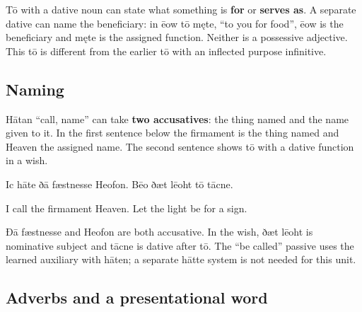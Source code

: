 Tō with a dative noun can state what something is \textbf{for} or \textbf{serves as}. A separate dative can name the beneficiary: in ēow tō męte, “to you for food”, ēow is the beneficiary and męte is the assigned function. Neither is a possessive adjective. This tō is different from the earlier tō with an inflected purpose infinitive.

\subsection*{Naming}

Hātan “call, name” can take \textbf{two accusatives}: the thing named and the name given to it. In the first sentence below the firmament is the thing named and Heaven the assigned name. The second sentence shows tō with a dative function in a wish.

Ic hāte ðā fæstnesse Heofon. Bēo ðæt lēoht tō tācne.

I call the firmament Heaven. Let the light be for a sign.

Ðā fæstnesse and Heofon are both accusative. In the wish, ðæt lēoht is nominative subject and tācne is dative after tō. The “be called” passive uses the learned auxiliary with hāten; a separate hātte system is not needed for this unit.

\subsection*{Adverbs and a presentational word}

